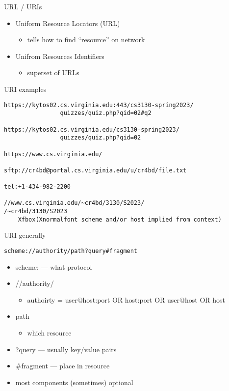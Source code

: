 \begin{frame}{URL / URIs}
\begin{itemize}
\item Uniform Resource Locators (URL)
    \begin{itemize}
    \item tells how to find ``resource'' on network
    \end{itemize}
\item Unifrom Resources Identifiers
    \begin{itemize}
    \item superset of URLs
    \end{itemize}
\end{itemize}
\end{frame}

\begin{frame}[fragile]{URI examples}
\begin{Verbatim}[fontsize=\small,commandchars=X()]
https://kytos02.cs.virginia.edu:443/cs3130-spring2023/
                quizzes/quiz.php?qid=02#q2

https://kytos02.cs.virginia.edu/cs3130-spring2023/
                quizzes/quiz.php?qid=02

https://www.cs.virginia.edu/

sftp://cr4bd@portal.cs.virginia.edu/u/cr4bd/file.txt

tel:+1-434-982-2200

//www.cs.virginia.edu/~cr4bd/3130/S2023/
/~cr4bd/3130/S2023
    Xfbox(Xnormalfont scheme and/or host implied from context)
\end{Verbatim}
\end{frame}


\begin{frame}[fragile]{URI generally}
\begin{Verbatim}
scheme://authority/path?query#fragment
\end{Verbatim}
\begin{itemize}
\item scheme: --- what protocol
\item //authority/
    \begin{itemize}
    \item authoirty = user@host:port OR host:port OR user@host OR host
    \end{itemize}
\item path
    \begin{itemize}
    \item which resource
    \end{itemize}
\item ?query --- usually key/value pairs 
\item \#fragment --- place in resource
\vspace{.5cm}
\item most components (sometimes) optional
\end{itemize}
\end{frame}
